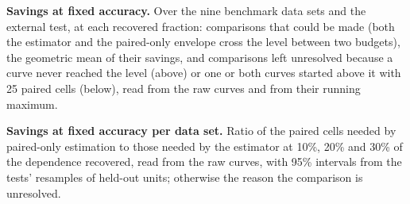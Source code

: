 \begin{table}[h]
\caption{\textbf{Savings at fixed accuracy.} Over the nine benchmark data sets and the external test, at each recovered fraction: comparisons that could be made (both the estimator and the paired-only envelope cross the level between two budgets), the geometric mean of their savings, and comparisons left unresolved because a curve never reached the level (above) or one or both curves started above it with 25 paired cells (below), read from the raw curves and from their running maximum.}
\label{tab:fixed}
\centering\footnotesize

\end{table}

\begin{table}[h]
\caption{\textbf{Savings at fixed accuracy per data set.} Ratio of the paired cells needed by paired-only estimation to those needed by the estimator at 10\%, 20\% and 30\% of the dependence recovered, read from the raw curves, with 95\% intervals from the tests' resamples of held-out units; otherwise the reason the comparison is unresolved.}
\label{tab:fixeddetail}
\centering\footnotesize

\end{table}
